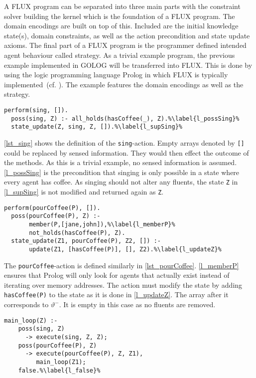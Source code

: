 A FLUX program can be separated into three main parts with the constraint solver building the kernel which is the foundation of a FLUX program. The domain encodings are built on top of this. Included are the initial knowledge state(s), domain constraints, as well as the action precondition and state update axioms. The final part of a FLUX program is the programmer defined intended agent behaviour called strategy. As a trivial example program, the previous example implemented in GOLOG will be transferred into FLUX. This is done by using the logic programming language Prolog in which FLUX is typically implemented~(cf. \cite{thielscher_reasoning_2006,martin_addressing_2001}). %
The example features the domain encodings as well as the strategy.
\begin{lstlisting}[caption={Defintion of the \texttt{sing}-action.}, label=lst_sing]
  perform(sing, []).
  poss(sing, Z) :- all_holds(hasCoffee(_), Z).%\label{l_possSing}%
  state_update(Z, sing, Z, []).%\label{l_supSing}%
\end{lstlisting}
\autoref{lst_sing} shows the definition of the \texttt{sing}-action. Empty arrays denoted by \texttt{[]} could be replaced by sensed information. They would then effect the outcome of the methods. As this is a trivial example, no sensed information is assumed. \autoref{l_possSing} is the precondition that singing is only possible in a state where every agent has coffee. As singing should not alter any fluents, the state \texttt{Z} in \autoref{l_supSing} is not modified and returned again as \texttt{Z}.
\begin{lstlisting}[firstnumber=4, caption={Definition of the \texttt{pourCoffee}-action}, label=lst_pourCoffee]
  perform(pourCoffee(P), []).
  poss(pourCoffee(P), Z) :-
       member(P,[jane,john]),%\label{l_memberP}%
       not_holds(hasCoffee(P), Z).
  state_update(Z1, pourCoffee(P), Z2, []) :-
       update(Z1, [hasCoffee(P)], [], Z2).%\label{l_updateZ}%
\end{lstlisting}
The \texttt{pourCoffee}-action is defined similarly in \autoref{lst_pourCoffee}. \autoref{l_memberP} ensures that Prolog will only look for agents that actually exist instead of iterating over memory addresses. The action must modify the state by adding \texttt{hasCoffee(P)} to the state as it is done in \autoref{l_updateZ}. The array after it corresponds to $\vartheta^-$. It is empty in this case as no fluents are removed.
\begin{lstlisting}[firstnumber=10, caption={Main method which either tells the robot to sing or to pour coffee.}, label=lst_main]
  main_loop(Z) :-
    poss(sing, Z)
      -> execute(sing, Z, Z);
    poss(pourCoffee(P), Z)
      -> execute(pourCoffee(P), Z, Z1),
         main_loop(Z1);
    false.%\label{l_false}%
\end{lstlisting}
